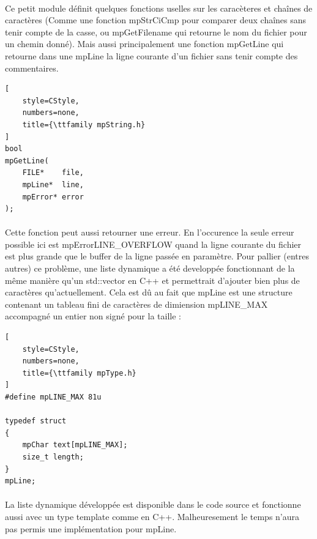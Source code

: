 \documentclass[12pt]{report} %
\begin{document}
\paragraph{}
Ce petit module définit quelques fonctions uselles sur les caracèteres et chaînes de caractères (Comme une fonction {\ttfamily mpStrCiCmp} pour comparer deux chaînes sans tenir compte de la casse, ou {\ttfamily mpGetFilename} qui retourne le nom du fichier pour un chemin donné). Mais aussi principalement une fonction {\ttfamily mpGetLine} qui retourne dans une {\ttfamily mpLine} la ligne courante d'un fichier sans tenir compte des commentaires.

\begin{lstlisting}[
    style=CStyle,
    numbers=none,
    title={\ttfamily mpString.h}
]
bool
mpGetLine(
    FILE*    file,
    mpLine*  line,
    mpError* error
);
\end{lstlisting}

\paragraph{}
Cette fonction peut aussi retourner une erreur. En l'occurence la seule erreur possible ici est {\ttfamily mpErrorLINE\_OVERFLOW} quand la ligne courante du fichier est plus grande que le buffer de la ligne passée en paramètre. Pour pallier (entres autres) ce problème, une liste dynamique a été developpée fonctionnant de la même manière qu'un {\ttfamily std::vector} en {\ttfamily C++} et permettrait d'ajouter bien plus de caractères qu'actuellement. Cela est dû au fait que {\ttfamily mpLine} est une structure contenant un tableau fini de caractères de dimiension {\ttfamily mpLINE\_MAX} accompagné un entier non signé pour la taille :

\begin{lstlisting}[
    style=CStyle,
    numbers=none,
    title={\ttfamily mpType.h}
]
#define mpLINE_MAX 81u

typedef struct
{
    mpChar text[mpLINE_MAX];
    size_t length;
}
mpLine;
\end{lstlisting}

\paragraph{}
La liste dynamique développée est disponible dans le code source et fonctionne aussi avec un type {\ttfamily template} comme en {\ttfamily C++}. Malheuresement le temps n'aura pas permis une implémentation pour {\ttfamily mpLine}.
\end{document}
